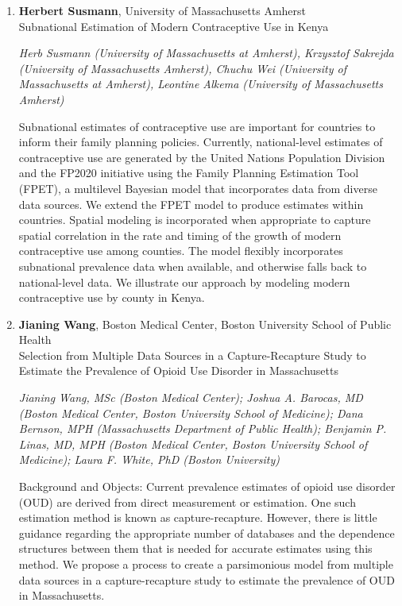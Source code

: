 \begin{enumerate}
\item \textbf{Herbert Susmann}, University of Massachusetts Amherst \\
Subnational Estimation of Modern Contraceptive Use in Kenya

\emph{\footnotesize Herb Susmann (University of Massachusetts at Amherst), Krzysztof Sakrejda (University of Massachusetts Amherst), Chuchu Wei (University of Massachusetts at Amherst), Leontine Alkema (University of Massachusetts Amherst)}

Subnational estimates of contraceptive use are important for countries to inform their family planning policies. Currently, national-level estimates of contraceptive use are generated by the United Nations Population Division and the FP2020 initiative using the Family Planning Estimation Tool (FPET), a multilevel Bayesian model that incorporates data from diverse data sources. We extend the FPET model to produce estimates within countries. Spatial modeling is incorporated when appropriate to capture spatial correlation in the rate and timing of the growth of modern contraceptive use among counties. The model flexibly incorporates subnational prevalence data when available, and otherwise falls back to national-level data. We illustrate our approach by modeling modern contraceptive use by county in Kenya.

\item \textbf{Jianing Wang}, Boston Medical Center, Boston University School of Public Health \\
Selection from Multiple Data Sources in a Capture-Recapture Study to Estimate the Prevalence of Opioid Use Disorder in Massachusetts

\emph{\footnotesize Jianing Wang, MSc (Boston Medical Center); Joshua A. Barocas, MD (Boston Medical Center, Boston University School of Medicine); Dana Bernson, MPH (Massachusetts Department of Public Health); Benjamin P. Linas, MD, MPH (Boston Medical Center, Boston University School of Medicine); Laura F. White, PhD (Boston University)}

Background and Objects: Current prevalence estimates of opioid use disorder (OUD) are derived from direct measurement or estimation. One such estimation method is known as capture-recapture. However, there is little guidance regarding the appropriate number of databases and the dependence structures between them that is needed for accurate estimates using this method. We propose a process to create a parsimonious model from multiple data sources in a capture-recapture study to estimate the prevalence of OUD in Massachusetts.


\end{enumerate}
